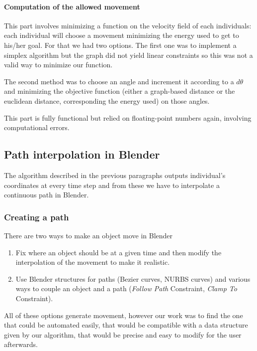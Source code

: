 \paragraph{Computation of the allowed movement}

This part involves minimizing a function on the velocity field of each
individuals: each individual will choose a movement minimizing the
energy used to get to his/her goal. For that we had two options. The
first one was to implement a simplex algorithm but the graph did not
yield linear constraints so this was not a valid way to minimize our
function.

The second method was to choose an angle and increment it according to
a $d\theta$ and minimizing the objective function (either a
graph-based distance or the euclidean distance, corresponding the
energy used) on those angles.

This part is fully functional but relied on floating-point numbers
again, involving computational errors.


\subsection{Path interpolation in Blender}

The algorithm described in the previous paragraphs outputs
individual's coordinates at every time step and from these we have to
interpolate a continuous path in Blender.


\subsubsection{Creating a path}

There are two ways to make an object move in Blender
\begin{enumerate}
\item Fix where an object should be at a given time and then modify
the interpolation of the movement to make it realistic.
\item Use Blender structures for paths (Bezier curves, NURBS curves)
and various ways to couple an object and a path (\textit{Follow Path}
Constraint, \textit{Clamp To} Constraint).
\end{enumerate}

All of these options generate movement, however our work was to find
the one that could be automated easily, that would be compatible with
a data structure given by our algorithm, that would be precise and
easy to modify for the user afterwards.

